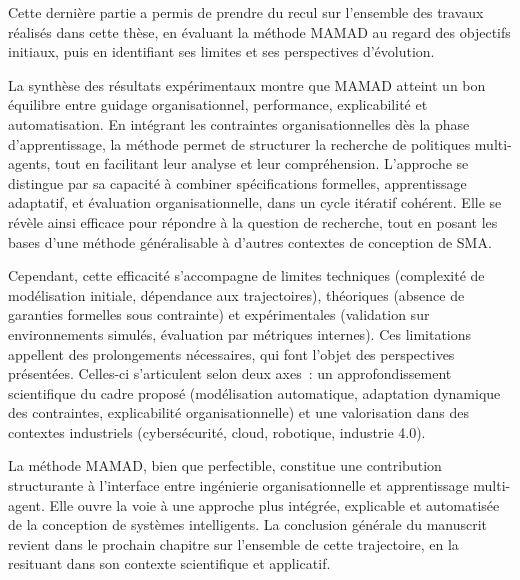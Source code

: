 \noindent
Cette dernière partie a permis de prendre du recul sur l’ensemble des travaux réalisés dans cette thèse, en évaluant la méthode \ac{MAMAD} au regard des objectifs initiaux, puis en identifiant ses limites et ses perspectives d’évolution.

\vspace{1em}

\noindent
La synthèse des résultats expérimentaux montre que \ac{MAMAD} atteint un bon équilibre entre guidage organisationnel, performance, explicabilité et automatisation. En intégrant les contraintes organisationnelles dès la phase d’apprentissage, la méthode permet de structurer la recherche de politiques multi-agents, tout en facilitant leur analyse et leur compréhension. L’approche se distingue par sa capacité à combiner spécifications formelles, apprentissage adaptatif, et évaluation organisationnelle, dans un cycle itératif cohérent. Elle se révèle ainsi efficace pour répondre à la question de recherche, tout en posant les bases d’une méthode généralisable à d'autres contextes de conception de SMA.

\vspace{1em}

\noindent
Cependant, cette efficacité s’accompagne de limites techniques (complexité de modélisation initiale, dépendance aux trajectoires), théoriques (absence de garanties formelles sous contrainte) et expérimentales (validation sur environnements simulés, évaluation par métriques internes). Ces limitations appellent des prolongements nécessaires, qui font l’objet des perspectives présentées. Celles-ci s’articulent selon deux axes~: un approfondissement scientifique du cadre proposé (modélisation automatique, adaptation dynamique des contraintes, explicabilité organisationnelle) et une valorisation dans des contextes industriels (cybersécurité, cloud, robotique, industrie 4.0).

\vspace{1em}

\noindent
La méthode MAMAD, bien que perfectible, constitue une contribution structurante à l’interface entre ingénierie organisationnelle et apprentissage multi-agent. Elle ouvre la voie à une approche plus intégrée, explicable et automatisée de la conception de systèmes intelligents. La conclusion générale du manuscrit revient dans le prochain chapitre sur l’ensemble de cette trajectoire, en la resituant dans son contexte scientifique et applicatif.
